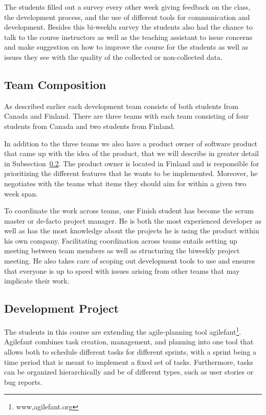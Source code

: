 The students filled out a survey every other week giving feedback on the class, the development process, and the use of different tools for communication and development.
Besides this bi-weeklu survey the students also had the chance to talk to the course instructors as well as the teaching assistant to issue concerns and make suggestion on how to improve the course for the students as well as issues they see with the quality of the collected or non-collected data.

\subsection{Team Composition}
As described earlier each development team consists of both students from Canada and Finland.
There are three teams with each team consisting of four students from Canada and two students from Finland.

In addition to the three teams we also have a product owner of software product that came up with the idea of the product, that we will describe in greater detail in Subsection~\ref{chap:make:subset:devproject}.
The product owner is located in Finland and is responsible for prioritizing the different features that he wants to be implemented.
Moreover, he negotiates with the teams what items they should aim for within a given two week span. 

To coordinate the work across teams, one Finish student has become the scrum master or de-facto project manager.
He is both the most experienced developer as well as has the most knowledge about the projects he is using the product within his own company.
Facilitating coordination across teams entails setting up meeting between team members as well as structuring the biweekly project meeting.
He also takes care of scoping out development tools to use and ensures that everyone is up to speed with issues arising from other teams that may implicate their work.

\subsection{Development Project}
\label{chap:make:subset:devproject}
The students in this course are extending the agile-planning tool agilefant\footnote{www,agilefant.org}.
Agilefant combines task creation, management, and planning into one tool that allows both to schedule different tasks for different sprints, with a sprint being a time period that is meant to implement a fixed set of tasks.
Furthermore, tasks can be organized hierarchically and be of different types, such as user stories or bug reports.
 
